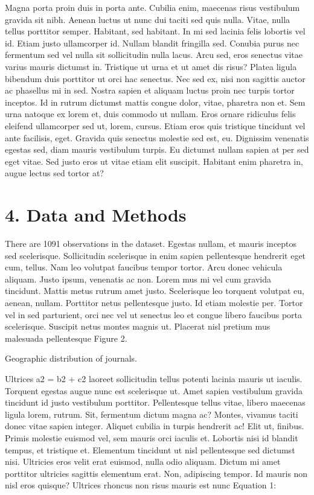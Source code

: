 \documentclass[
  12,
]{article}
\begin{document}
Magna porta proin duis in porta ante. Cubilia enim, maecenas risus
vestibulum gravida sit nibh. Aenean luctus ut nunc dui taciti sed quis
nulla. Vitae, nulla tellus porttitor semper. Habitant, sed habitant. In
mi sed lacinia felis lobortis vel id. Etiam justo ullamcorper id. Nullam
blandit fringilla sed. Conubia purus nec fermentum sed vel nulla sit
sollicitudin nulla lacus. Arcu sed, eros senectus vitae varius mauris
dictumst in. Tristique ut urna et ut amet dis risus? Platea ligula
bibendum duis porttitor ut orci hac senectus. Nec sed ex, nisi non
sagittis auctor ac phasellus mi in sed. Nostra sapien et aliquam luctus
proin nec turpis tortor inceptos. Id in rutrum dictumst mattis congue
dolor, vitae, pharetra non et. Sem urna natoque ex lorem et, duis
commodo ut nullam. Eros ornare ridiculus felis eleifend ullamcorper sed
ut, lorem, cursus. Etiam eros quis tristique tincidunt vel ante
facilisis, eget. Gravida quis senectus molestie sed est, eu. Dignissim
venenatis egestas sed, diam mauris vestibulum turpis. Eu dictumst nullam
sapien at per sed eget vitae. Sed justo eros ut vitae etiam elit
suscipit. Habitant enim pharetra in, augue lectus sed tortor at?

\hypertarget{data-and-methods}{%
\section{4. Data and Methods}\label{data-and-methods}}

There are 1091 observations in the dataset. Egestas nullam, et mauris
inceptos sed scelerisque. Sollicitudin scelerisque in enim sapien
pellentesque hendrerit eget cum, tellus. Nam leo volutpat faucibus
tempor tortor. Arcu donec vehicula aliquam. Justo ipsum, venenatis ac
non. Lorem mus mi vel cum gravida tincidunt. Mattis metus rutrum amet
justo. Scelerisque leo torquent volutpat eu, aenean, nullam. Porttitor
netus pellentesque justo. Id etiam molestie per. Tortor vel in sed
parturient, orci nec vel ut senectus leo et congue libero faucibus porta
scelerisque. Suscipit netus montes magnis ut. Placerat nisl pretium mus
malesuada pellentesque Figure 2.

Geographic distribution of journals.

Ultrices a2 = b2 + c2 laoreet sollicitudin tellus potenti lacinia mauris
ut iaculis. Torquent egestas augue nunc est scelerisque ut. Amet sapien
vestibulum gravida tincidunt id justo vestibulum porttitor. Pellentesque
tellus vitae, libero maecenas ligula lorem, rutrum. Sit, fermentum
dictum magna ac? Montes, vivamus taciti donec vitae sapien integer.
Aliquet cubilia in turpis hendrerit ac! Elit ut, finibus. Primis
molestie euismod vel, sem mauris orci iaculis et. Lobortis nisi id
blandit tempus, et tristique et. Elementum tincidunt ut nisl
pellentesque sed dictumst nisi. Ultricies eros velit erat euismod, nulla
odio aliquam. Dictum mi amet porttitor ultricies sagittis elementum
erat. Non, adipiscing tempor. Id mauris non nisl eros quisque? Ultrices
rhoncus non risus mauris est nunc Equation 1:
\end{document}
